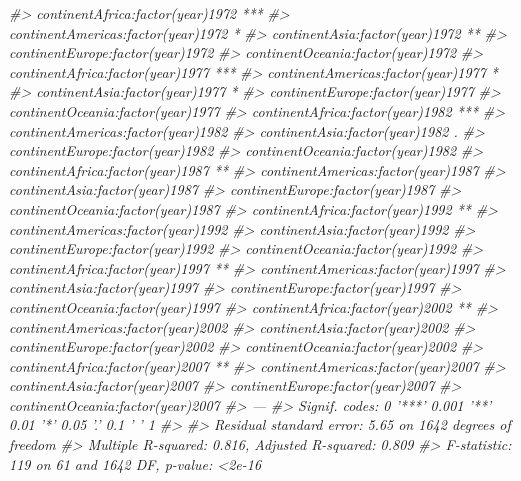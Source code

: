 \documentclass[]{book}
\newenvironment{Shaded}{\begin{snugshade}}{\end{snugshade}}
\newcommand{\CommentTok}[1]{\textcolor[rgb]{0.56,0.35,0.01}{\textit{#1}}}
\begin{document}
\begin{Shaded}
\begin{Highlighting}[]
\CommentTok{#> continentAfrica:factor(year)1972   ***}
\CommentTok{#> continentAmericas:factor(year)1972 *  }
\CommentTok{#> continentAsia:factor(year)1972     ** }
\CommentTok{#> continentEurope:factor(year)1972      }
\CommentTok{#> continentOceania:factor(year)1972     }
\CommentTok{#> continentAfrica:factor(year)1977   ***}
\CommentTok{#> continentAmericas:factor(year)1977 *  }
\CommentTok{#> continentAsia:factor(year)1977     *  }
\CommentTok{#> continentEurope:factor(year)1977      }
\CommentTok{#> continentOceania:factor(year)1977     }
\CommentTok{#> continentAfrica:factor(year)1982   ***}
\CommentTok{#> continentAmericas:factor(year)1982    }
\CommentTok{#> continentAsia:factor(year)1982     .  }
\CommentTok{#> continentEurope:factor(year)1982      }
\CommentTok{#> continentOceania:factor(year)1982     }
\CommentTok{#> continentAfrica:factor(year)1987   ** }
\CommentTok{#> continentAmericas:factor(year)1987    }
\CommentTok{#> continentAsia:factor(year)1987        }
\CommentTok{#> continentEurope:factor(year)1987      }
\CommentTok{#> continentOceania:factor(year)1987     }
\CommentTok{#> continentAfrica:factor(year)1992   ** }
\CommentTok{#> continentAmericas:factor(year)1992    }
\CommentTok{#> continentAsia:factor(year)1992        }
\CommentTok{#> continentEurope:factor(year)1992      }
\CommentTok{#> continentOceania:factor(year)1992     }
\CommentTok{#> continentAfrica:factor(year)1997   ** }
\CommentTok{#> continentAmericas:factor(year)1997    }
\CommentTok{#> continentAsia:factor(year)1997        }
\CommentTok{#> continentEurope:factor(year)1997      }
\CommentTok{#> continentOceania:factor(year)1997     }
\CommentTok{#> continentAfrica:factor(year)2002   ** }
\CommentTok{#> continentAmericas:factor(year)2002    }
\CommentTok{#> continentAsia:factor(year)2002        }
\CommentTok{#> continentEurope:factor(year)2002      }
\CommentTok{#> continentOceania:factor(year)2002     }
\CommentTok{#> continentAfrica:factor(year)2007   ** }
\CommentTok{#> continentAmericas:factor(year)2007    }
\CommentTok{#> continentAsia:factor(year)2007        }
\CommentTok{#> continentEurope:factor(year)2007      }
\CommentTok{#> continentOceania:factor(year)2007     }
\CommentTok{#> ---}
\CommentTok{#> Signif. codes:  0 '***' 0.001 '**' 0.01 '*' 0.05 '.' 0.1 ' ' 1}
\CommentTok{#> }
\CommentTok{#> Residual standard error: 5.65 on 1642 degrees of freedom}
\CommentTok{#> Multiple R-squared:  0.816,  Adjusted R-squared:  0.809 }
\CommentTok{#> F-statistic:  119 on 61 and 1642 DF,  p-value: <2e-16}
\end{Highlighting}
\end{Shaded}
\end{document}
